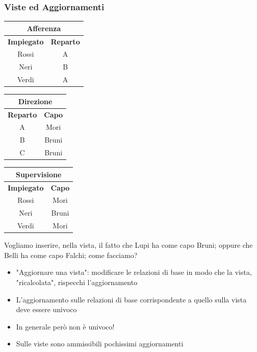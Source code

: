 \documentclass[../main.tex]{subfiles}
\begin{document}
	\subsubsection{Viste ed Aggiornamenti}
	\begin{center}
		\begin{tabular}{ |c|c| }
			\hline
			\multicolumn{2}{|c|}{Afferenza}\\
			\hline
			\textbf{Impiegato} & \textbf{Reparto} \\
			\hline
			Rossi & A\\
			Neri & B\\
			Verdi & A\\
			\hline
		\end{tabular}
		\begin{tabular}{ |c|c| }
			\hline
			\multicolumn{2}{|c|}{Direzione}\\
			\hline
			\textbf{Reparto} & \textbf{Capo} \\
			\hline
			A & Mori\\
			B & Bruni\\
			C & Bruni\\
			\hline
		\end{tabular}
	\end{center}
	\begin{center}
		\begin{tabular}{ |c|c| }
			\hline
			\multicolumn{2}{|c|}{Supervisione}\\
			\hline
			\textbf{Impiegato} & \textbf{Capo} \\
			\hline
			Rossi & Mori\\
			Neri & Bruni\\
			Verdi & Mori\\
			\hline
		\end{tabular}
	\end{center}
	Vogliamo inserire, nella vista, il fatto che Lupi ha come capo Bruni; oppure che Belli ha come capo Falchi; come facciamo?
	\begin{itemize}
		\item "Aggiornare una vista": modificare le relazioni di base in modo che la vista, "ricalcolata", rispecchi l'aggiornamento
		\item L'aggiornamento sulle relazioni di base corrispondente a quello sulla vista deve essere univoco
		\item In generale però non è univoco!
		\item Sulle viste sono ammissibili pochissimi aggiornamenti
	\end{itemize}
\end{document}
